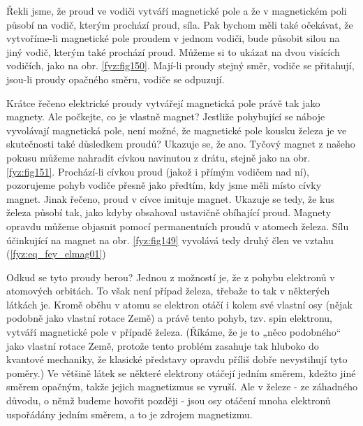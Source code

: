    Řekli jsme, že proud ve vodiči vytváří magnetické pole a že v magnetickém poli působí na vodič, 
    kterým prochází proud, síla. Pak bychom měli také očekávat, že vytvoříme-li magnetické pole 
    proudem v jednom vodiči, bude působit silou na jiný vodič, kterým také prochází proud. Můžeme 
    si to ukázat na dvou visících vodičích, jako na obr. \ref{fyz:fig150}. Mají-li proudy 
    stejný směr, vodiče se přitahují, jsou-li proudy opačného směru, vodiče se odpuzují.
    
    Krátce řečeno elektrické proudy vytvářejí magnetická pole právě tak jako magnety. Ale počkejte, 
    co je vlastně magnet? Jestliže pohybující se náboje vyvolávají magnetická pole, není možné, že 
    magnetické pole kousku železa je ve skutečnosti také důsledkem proudů? Ukazuje se, že ano. 
    Tyčový magnet z našeho pokusu můžeme nahradit cívkou navinutou z drátu, stejně jako na obr. 
    \ref{fyz:fig151}. Prochází-li cívkou proud (jakož i přímým vodičem nad ní), pozorujeme 
    pohyb vodiče přesně jako předtím, kdy jsme měli místo cívky magnet. Jinak řečeno, proud v cívce 
    imituje magnet. Ukazuje se tedy, že kus železa působí tak, jako kdyby obsahoval ustavičně 
    obíhající proud. Magnety opravdu můžeme objasnit pomocí permanentních proudů v atomech železa. 
    Sílu účinkující na magnet na obr. \ref{fyz:fig149} vyvolává tedy druhý člen ve vztahu 
    (\ref{fyz:eq_fey_elmag01})      
    
  
    Odkud se tyto proudy berou? Jednou z možností je, že z pohybu elektronů v atomových orbitách. 
    To však není případ železa, třebaže to tak v některých látkách je. Kromě oběhu v atomu se 
    elektron otáčí i kolem své vlastní osy (nějak podobně jako vlastní rotace Země) a právě tento 
    pohyb, tzv. spin elektronu, vytváří magnetické pole v případě železa. (Říkáme, že je to „něco 
    podobného“ jako vlastní rotace Země, protože tento problém zasahuje tak hluboko do kvantové 
    mechaniky, že klasické představy opravdu příliš dobře nevystihují tyto poměry.) Ve většině 
    látek se některé elektrony otáčejí jedním směrem, kdežto jiné směrem opačným, takže jejich 
    magnetizmus se vyruší. Ale v železe - ze záhadného důvodu, o němž budeme hovořit později - jsou 
    osy otáčení mnoha elektronů uspořádány jedním směrem, a to je zdrojem magnetizmu.
    
